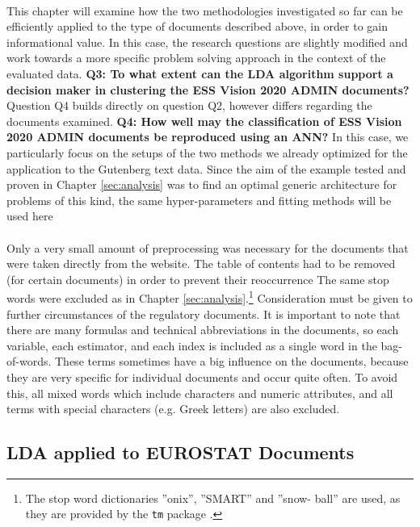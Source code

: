 \documentclass[11pt,a4paper]{article}
\begin{document}
\ \\
This chapter will examine how the two methodologies investigated so far can be efficiently applied to the type of documents described above, in order to gain informational value. In this case, the research questions are slightly modified and work towards a more specific problem solving approach in the context of the evaluated data. \textbf{Q3: To what extent can the LDA algorithm support a decision maker in clustering the ESS Vision 2020 ADMIN documents?} Question Q4 builds directly on question Q2, however differs regarding the documents examined. \textbf{Q4: How well may the classification of ESS Vision 2020 ADMIN documents be reproduced using an ANN?} In this case, we particularly focus on the setups of the two methods we already optimized for the application to the Gutenberg text data. 
Since the aim of the example tested and proven in Chapter \ref{sec:analysis} was to find an optimal generic architecture for problems of this kind, the same hyper-parameters and fitting methods will be used here\\
\ \\
Only a very small amount of preprocessing was necessary for the documents that were taken directly from the website. The table of contents had to be removed (for certain documents) in order to prevent their reoccurrence The same stop words were excluded as in Chapter \ref{sec:analysis}.\footnote{The stop word dictionaries ”onix”, ”SMART” and ”snow- ball” are used, as they are provided by the \texttt{tm} package \cite{Silge2017}.} Consideration must be given to further circumstances of the regulatory documents. It is important to note that there are many formulas and technical abbreviations in the documents, so each variable, each estimator, and each index is included as a single word in the bag-of-words. These terms sometimes have a big influence on the documents, because they are very specific for individual documents and occur quite often. To avoid this, all mixed words which include characters and numeric attributes, and all terms with special characters (e.g. Greek letters) are also excluded.

\subsection{LDA applied to EUROSTAT Documents} \label{Example2}
\end{document}
